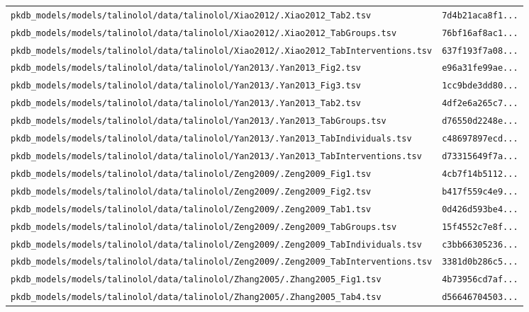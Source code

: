 \documentclass{article}
\begin{document}
\begin{longtable}{ll}
\texttt{pkdb\_models/models/talinolol/data/talinolol/Xiao2012/.Xiao2012\_Tab2.tsv} & \texttt{7d4b21aca8f1...} \\
\texttt{pkdb\_models/models/talinolol/data/talinolol/Xiao2012/.Xiao2012\_TabGroups.tsv} & \texttt{76bf16af8ac1...} \\
\texttt{pkdb\_models/models/talinolol/data/talinolol/Xiao2012/.Xiao2012\_TabInterventions.tsv} & \texttt{637f193f7a08...} \\
\texttt{pkdb\_models/models/talinolol/data/talinolol/Yan2013/.Yan2013\_Fig2.tsv} & \texttt{e96a31fe99ae...} \\
\texttt{pkdb\_models/models/talinolol/data/talinolol/Yan2013/.Yan2013\_Fig3.tsv} & \texttt{1cc9bde3dd80...} \\
\texttt{pkdb\_models/models/talinolol/data/talinolol/Yan2013/.Yan2013\_Tab2.tsv} & \texttt{4df2e6a265c7...} \\
\texttt{pkdb\_models/models/talinolol/data/talinolol/Yan2013/.Yan2013\_TabGroups.tsv} & \texttt{d76550d2248e...} \\
\texttt{pkdb\_models/models/talinolol/data/talinolol/Yan2013/.Yan2013\_TabIndividuals.tsv} & \texttt{c48697897ecd...} \\
\texttt{pkdb\_models/models/talinolol/data/talinolol/Yan2013/.Yan2013\_TabInterventions.tsv} & \texttt{d73315649f7a...} \\
\texttt{pkdb\_models/models/talinolol/data/talinolol/Zeng2009/.Zeng2009\_Fig1.tsv} & \texttt{4cb7f14b5112...} \\
\texttt{pkdb\_models/models/talinolol/data/talinolol/Zeng2009/.Zeng2009\_Fig2.tsv} & \texttt{b417f559c4e9...} \\
\texttt{pkdb\_models/models/talinolol/data/talinolol/Zeng2009/.Zeng2009\_Tab1.tsv} & \texttt{0d426d593be4...} \\
\texttt{pkdb\_models/models/talinolol/data/talinolol/Zeng2009/.Zeng2009\_TabGroups.tsv} & \texttt{15f4552c7e8f...} \\
\texttt{pkdb\_models/models/talinolol/data/talinolol/Zeng2009/.Zeng2009\_TabIndividuals.tsv} & \texttt{c3bb66305236...} \\
\texttt{pkdb\_models/models/talinolol/data/talinolol/Zeng2009/.Zeng2009\_TabInterventions.tsv} & \texttt{3381d0b286c5...} \\
\texttt{pkdb\_models/models/talinolol/data/talinolol/Zhang2005/.Zhang2005\_Fig1.tsv} & \texttt{4b73956cd7af...} \\
\texttt{pkdb\_models/models/talinolol/data/talinolol/Zhang2005/.Zhang2005\_Tab4.tsv} & \texttt{d56646704503...} \\

\end{longtable}
\end{document}

